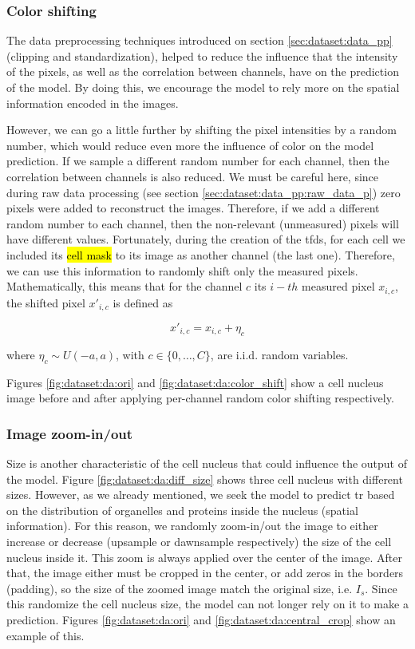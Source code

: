 \subsubsection{Color shifting}

The data preprocessing techniques introduced on section \ref{sec:dataset:data_pp} (clipping and standardization), helped to reduce the influence that the intensity of the pixels, as well as the correlation between channels, have on the prediction of the model. By doing this, we encourage the model to rely more on the spatial information encoded in the images.

However, we can go a little further by shifting the pixel intensities by a random number, which would reduce even more the influence of color on the model prediction. If we sample a different random number for each channel, then the correlation between channels is also reduced. We must be careful here, since during raw data processing (see section \ref{sec:dataset:data_pp:raw_data_p}) zero pixels were added to reconstruct the images. Therefore, if we add a different random number to each channel, then the non-relevant (unmeasured) pixels will have different values. Fortunately, during the creation of the \gls{tfds}, for each cell we included its \hl{cell mask} to its image as another channel (the last one). Therefore, we can use this information to randomly shift only the measured pixels. Mathematically, this means that for the channel $c$ its $i-th$ measured pixel $x_{i,c}$, the shifted pixel $x'_{i,c}$ is defined as

\begin{equation}
  x'_{i,c} = x_{i,c} + \eta_c
\end{equation}

\noindent where $\eta_c \sim U(-a, a)$, with $c\in\{0, \dots, C\}$, are i.i.d. random variables.

Figures \ref{fig:dataset:da:ori} and \ref{fig:dataset:da:color_shift} show a cell nucleus image before and after applying per-channel random color shifting respectively.

\subsubsection{Image zoom-in/out}

Size is another characteristic of the cell nucleus that could influence the output of the model. Figure \ref{fig:dataset:da:diff_size} shows three cell nucleus with different sizes. However, as we already mentioned, we seek the model to predict \gls{tr} based on the distribution of organelles and proteins inside the nucleus (spatial information). For this reason, we randomly zoom-in/out the image to either increase or decrease (upsample or dawnsample respectively) the size of the cell nucleus inside it. This zoom is always applied over the center of the image. After that, the image either must be cropped in the center, or add zeros in the borders (padding), so the size of the zoomed image match the original size, i.e. $I_s$. Since this randomize the cell nucleus size, the model can not longer rely on it to make a prediction. Figures \ref{fig:dataset:da:ori} and \ref{fig:dataset:da:central_crop} show an example of this.

